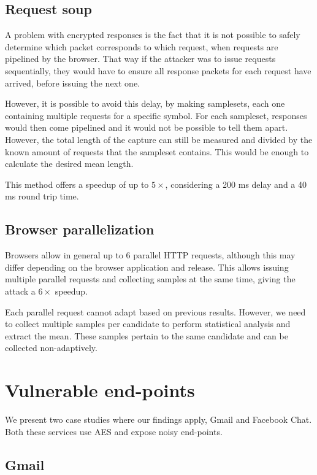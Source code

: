 \documentclass[a4paper, 11 pt, conference]{article}  %
\begin{document}
\subsection{Request soup}

A problem with encrypted responses is the fact that it is not possible to safely
determine which packet corresponds to which request, when requests are pipelined
by the browser. That way if the attacker was to issue
requests sequentially, they would have to ensure all response packets for each request
have arrived, before issuing the next one.

However, it is possible to avoid this delay, by making samplesets, each one containing multiple
requests for a specific symbol. For each sampleset, responses would then come pipelined and it
would not be possible to tell them apart. However, the total length of the capture can still be
measured and divided by the known amount of requests that the sampleset
contains. This would be enough to calculate the desired mean length.

This method offers a speedup of up to $5\times$, considering a 200
ms delay and a 40 ms round trip time.

\subsection{Browser parallelization}

Browsers allow in general up to 6 parallel HTTP requests, although this may differ depending
on the browser application and release. This allows issuing multiple parallel requests and
collecting samples at the same time, giving the attack a $6\times$ speedup.

Each parallel request cannot adapt based on previous results.
However, we need to collect multiple samples per candidate to perform
statistical analysis and extract the mean. These samples pertain to the same
candidate and can be collected non-adaptively.


\section{Vulnerable end-points}

We present two case studies where our findings apply, Gmail and Facebook Chat.
Both these services use AES and expose noisy end-points.

\subsection{Gmail}
\end{document}
